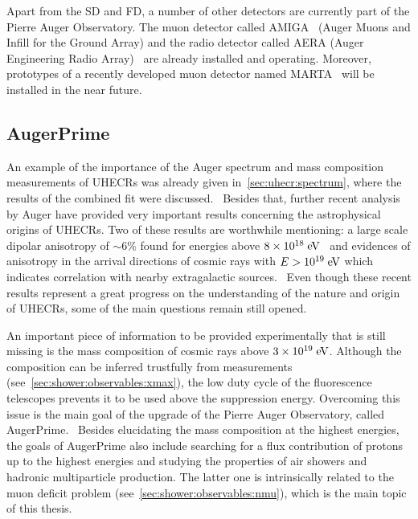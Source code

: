 Apart from the SD and FD, a number of other detectors are currently
part of the Pierre Auger Observatory.
The muon detector called AMIGA~\cite{Suarez:2013ecb,Wundheiler:2011zz,Platino:2011zz}
(Auger Muons and Infill for the Ground Array) and the radio detector
called AERA (Auger Engineering Radio Array)~\cite{Kelley:2011zz} are already installed
and operating. Moreover, prototypes of a recently developed muon detector
named MARTA~\cite{Abreu:2017vsj} will be installed in the near future.


\subsection{AugerPrime}

An example of the importance of the Auger spectrum
and mass composition measurements of UHECRs was
already given in~\cref{sec:uhecr:spectrum},
where the results of the combined fit were discussed.~\cite{Aab:2016zth} 
Besides that, further recent analysis by Auger have provided very
important results concerning the astrophysical origins of
UHECRs. Two of these results are worthwhile mentioning:
a large scale dipolar anisotropy
of $\sim 6\%$ found for energies above $8\times \mbox{$10^{18}\;\mbox{e\kern-0.1em V}$}$~\cite{Aab:2017tyv}
and evidences of anisotropy in the arrival directions
of cosmic rays with $E>\mbox{$10^{19}\;\mbox{e\kern-0.1em V}$}$ which indicates correlation with
nearby extragalactic sources.~\cite{Aab:2018chp} Even though these recent results
represent a great progress on the understanding of the nature and origin
of UHECRs, some of the main questions remain still opened.

An important piece of information to be provided experimentally that
is still missing is the mass composition of cosmic rays above $3 \times \mbox{$10^{19}\;\mbox{e\kern-0.1em V}$}$.
Although the composition can be inferred trustfully from \xmax measurements
(see~\cref{sec:shower:observables:xmax}),
the low duty cycle of the fluorescence telescopes prevents
it to be used above the suppression energy.
Overcoming this issue is the main goal of the upgrade of the Pierre Auger Observatory,
called AugerPrime.~\cite{Aab:2016vlz,Martello:2017pch}
Besides elucidating the mass composition at the highest energies,
the goals of AugerPrime also include searching for a flux contribution of protons up to the highest
energies and studying the properties of air showers and hadronic multiparticle production.
The latter one is intrinsically related
to the muon deficit problem (see~\cref{sec:shower:observables:nmu}),
which is the main topic of this thesis.


